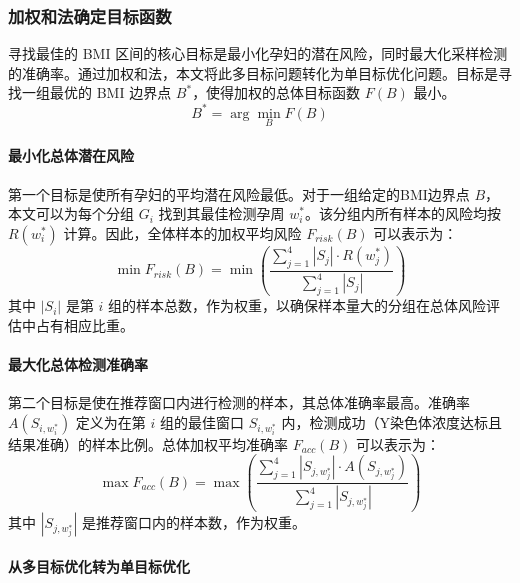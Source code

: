 \subsubsection{加权和法确定目标函数}

寻找最佳的 BMI 区间的核心目标是最小化孕妇的潜在风险，同时最大化采样检测的准确率。通过加权和法，本文将此多目标问题转化为单目标优化问题。目标是寻找一组最优的 BMI 边界点 $B^*$，使得加权的总体目标函数 $F(B)$ 最小。
\begin{equation}
    B^* = \arg\min_{B} F(B)
    \label{eq:optimization_goal}
\end{equation}

\paragraph*{最小化总体潜在风险}

第一个目标是使所有孕妇的平均潜在风险最低。对于一组给定的BMI边界点 $B$，本文可以为每个分组 $G_i$ 找到其最佳检测孕周 $w_i^*$。该分组内所有样本的风险均按 $R(w_i^*)$ 计算。因此，全体样本的加权平均风险 $F_{risk}(B)$ 可以表示为：
\begin{equation}
    \min F_{risk}(B) = \min \left( \frac{\sum_{j=1}^{4} |S_j| \cdot R(w_j^*)}{\sum_{j=1}^{4} |S_j|} \right)
    \label{eq:risk_objective}
\end{equation}
其中 $|S_i|$ 是第 $i$ 组的样本总数，作为权重，以确保样本量大的分组在总体风险评估中占有相应比重。

\paragraph*{最大化总体检测准确率}

第二个目标是使在推荐窗口内进行检测的样本，其总体准确率最高。准确率 $A(S_{i, w_i^*})$ 定义为在第 $i$ 组的最佳窗口 $S_{i, w_i^*}$ 内，检测成功（Y染色体浓度达标且结果准确）的样本比例。总体加权平均准确率 $F_{acc}(B)$ 可以表示为：
\begin{equation}
    \max F_{acc}(B) = \max \left( \frac{\sum_{j=1}^{4} |S_{j, w_j^*}| \cdot A(S_{j, w_j^*})}{\sum_{j=1}^{4} |S_{j, w_j^*}|} \right)
    \label{eq:accuracy_objective}
\end{equation}
其中 $|S_{j, w_j^*}|$ 是推荐窗口内的样本数，作为权重。

\paragraph*{从多目标优化转为单目标优化}

